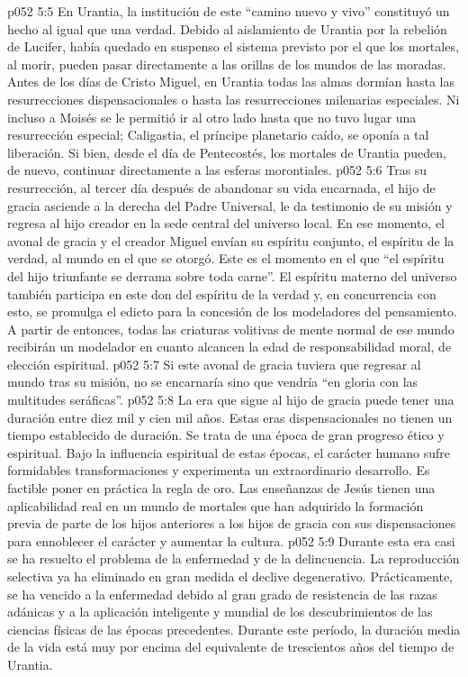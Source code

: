 \vs p052 5:5 En Urantia, la institución de este “camino nuevo y vivo” constituyó un hecho al igual que una verdad. Debido al aislamiento de Urantia por la rebelión de Lucifer, había quedado en suspenso el sistema previsto por el que los mortales, al morir, pueden pasar directamente a las orillas de los mundos de las moradas. Antes de los días de Cristo Miguel, en Urantia todas las almas dormían hasta las resurrecciones dispensacionales o hasta las resurrecciones milenarias especiales. Ni incluso a Moisés se le permitió ir al otro lado hasta que no tuvo lugar una resurrección especial; Caligastia, el príncipe planetario caído, se oponía a tal liberación. Si bien, desde el día de Pentecostés, los mortales de Urantia pueden, de nuevo, continuar directamente a las esferas morontiales.
\vs p052 5:6 \pc Tras su resurrección, al tercer día después de abandonar su vida encarnada, el hijo de gracia asciende a la derecha del Padre Universal, le da testimonio de su misión y regresa al hijo creador en la sede central del universo local. En ese momento, el avonal de gracia y el creador Miguel envían su espíritu conjunto, el espíritu de la verdad, al mundo en el que se otorgó. Este es el momento en el que “el espíritu del hijo triunfante se derrama sobre toda carne”. El espíritu materno del universo también participa en este don del espíritu de la verdad y, en concurrencia con esto, se promulga el edicto para la concesión de los modeladores del pensamiento. A partir de entonces, todas las criaturas volitivas de mente normal de ese mundo recibirán un modelador en cuanto alcancen la edad de responsabilidad moral, de elección espiritual.
\vs p052 5:7 Si este avonal de gracia tuviera que regresar al mundo tras su misión, no se encarnaría sino que vendría “en gloria con las multitudes seráficas”.
\vs p052 5:8 \pc La era que sigue al hijo de gracia puede tener una duración entre diez mil y cien mil años. Estas eras dispensacionales no tienen un tiempo establecido de duración. Se trata de una época de gran progreso ético y espiritual. Bajo la influencia espiritual de estas épocas, el carácter humano sufre formidables transformaciones y experimenta un extraordinario desarrollo. Es factible poner en práctica la regla de oro. Las enseñanzas de Jesús tienen una aplicabilidad real en un mundo de mortales que han adquirido la formación previa de parte de los hijos anteriores a los hijos de gracia con sus dispensaciones para ennoblecer el carácter y aumentar la cultura.
\vs p052 5:9 Durante esta era casi se ha resuelto el problema de la enfermedad y de la delincuencia. La reproducción selectiva ya ha eliminado en gran medida el declive degenerativo. Prácticamente, se ha vencido a la enfermedad debido al gran grado de resistencia de las razas adánicas y a la aplicación inteligente y mundial de los descubrimientos de las ciencias físicas de las épocas precedentes. Durante este período, la duración media de la vida está muy por encima del equivalente de trescientos años del tiempo de Urantia.
